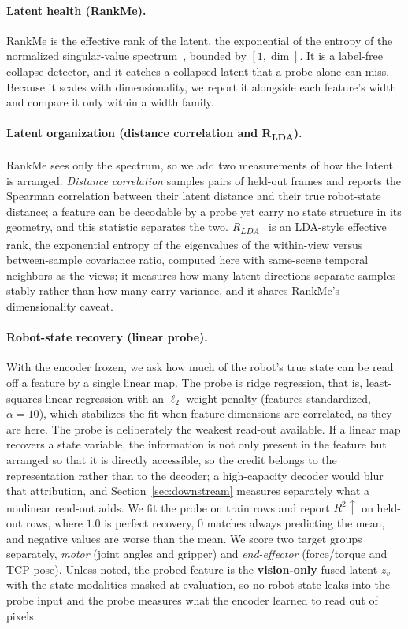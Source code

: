 \documentclass{article}
\begin{document}
\paragraph{Latent health (RankMe).} RankMe is the effective rank of the latent, the exponential of the entropy of the normalized singular-value spectrum~\citep{rankme2023}, bounded by $[1,\dim]$. It is a label-free collapse detector, and it catches a collapsed latent that a probe alone can miss. Because it scales with dimensionality, we report it alongside each feature's width and compare it only within a width family.

\paragraph{Latent organization (distance correlation and R\textsubscript{LDA}).} RankMe sees only the spectrum, so we add two measurements of how the latent is arranged. \emph{Distance correlation} samples pairs of held-out frames and reports the Spearman correlation between their latent distance and their true robot-state distance; a feature can be decodable by a probe yet carry no state structure in its geometry, and this statistic separates the two. \emph{R\textsubscript{LDA}}~\citep{jepamsac2026} is an LDA-style effective rank, the exponential entropy of the eigenvalues of the within-view versus between-sample covariance ratio, computed here with same-scene temporal neighbors as the views; it measures how many latent directions separate samples stably rather than how many carry variance, and it shares RankMe's dimensionality caveat.

\paragraph{Robot-state recovery (linear probe).} With the encoder frozen, we ask how much of the robot's true state can be read off a feature by a single linear map. The probe is ridge regression, that is, least-squares linear regression with an $\ell_2$ weight penalty (features standardized, $\alpha=10$), which stabilizes the fit when feature dimensions are correlated, as they are here. The probe is deliberately the weakest read-out available. If a linear map recovers a state variable, the information is not only present in the feature but arranged so that it is directly accessible, so the credit belongs to the representation rather than to the decoder; a high-capacity decoder would blur that attribution, and Section~\ref{sec:downstream} measures separately what a nonlinear read-out adds. We fit the probe on train rows and report $R^2\uparrow$ on held-out rows, where $1.0$ is perfect recovery, $0$ matches always predicting the mean, and negative values are worse than the mean. We score two target groups separately, \emph{motor} (joint angles and gripper) and \emph{end-effector} (force/torque and TCP pose). Unless noted, the probed feature is the \textbf{vision-only} fused latent $z_v$ with the state modalities masked at evaluation, so no robot state leaks into the probe input and the probe measures what the encoder learned to read out of pixels.
\end{document}
